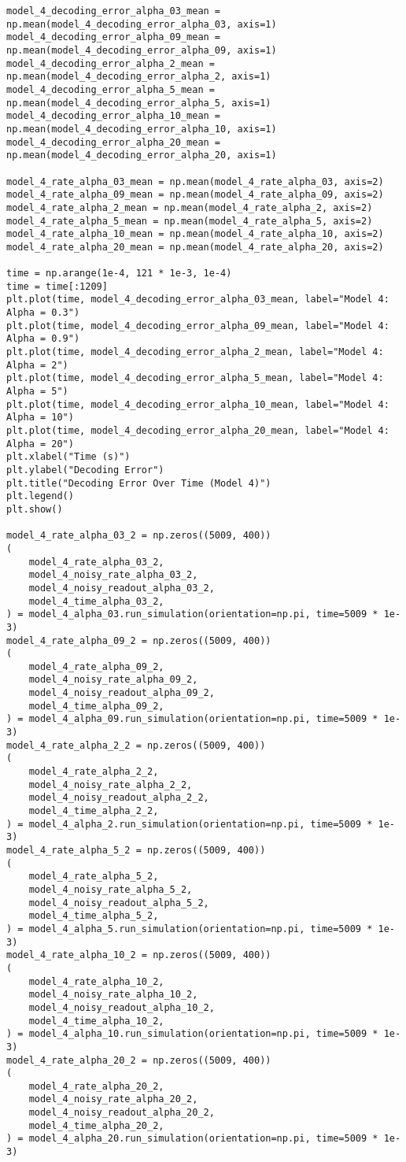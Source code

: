 \documentclass[a4paper, 11pt, oneside]{report}
\begin{document}
\begin{verbatim}
model_4_decoding_error_alpha_03_mean = np.mean(model_4_decoding_error_alpha_03, axis=1)
model_4_decoding_error_alpha_09_mean = np.mean(model_4_decoding_error_alpha_09, axis=1)
model_4_decoding_error_alpha_2_mean = np.mean(model_4_decoding_error_alpha_2, axis=1)
model_4_decoding_error_alpha_5_mean = np.mean(model_4_decoding_error_alpha_5, axis=1)
model_4_decoding_error_alpha_10_mean = np.mean(model_4_decoding_error_alpha_10, axis=1)
model_4_decoding_error_alpha_20_mean = np.mean(model_4_decoding_error_alpha_20, axis=1)

model_4_rate_alpha_03_mean = np.mean(model_4_rate_alpha_03, axis=2)
model_4_rate_alpha_09_mean = np.mean(model_4_rate_alpha_09, axis=2)
model_4_rate_alpha_2_mean = np.mean(model_4_rate_alpha_2, axis=2)
model_4_rate_alpha_5_mean = np.mean(model_4_rate_alpha_5, axis=2)
model_4_rate_alpha_10_mean = np.mean(model_4_rate_alpha_10, axis=2)
model_4_rate_alpha_20_mean = np.mean(model_4_rate_alpha_20, axis=2)

time = np.arange(1e-4, 121 * 1e-3, 1e-4)
time = time[:1209]
plt.plot(time, model_4_decoding_error_alpha_03_mean, label="Model 4: Alpha = 0.3")
plt.plot(time, model_4_decoding_error_alpha_09_mean, label="Model 4: Alpha = 0.9")
plt.plot(time, model_4_decoding_error_alpha_2_mean, label="Model 4: Alpha = 2")
plt.plot(time, model_4_decoding_error_alpha_5_mean, label="Model 4: Alpha = 5")
plt.plot(time, model_4_decoding_error_alpha_10_mean, label="Model 4: Alpha = 10")
plt.plot(time, model_4_decoding_error_alpha_20_mean, label="Model 4: Alpha = 20")
plt.xlabel("Time (s)")
plt.ylabel("Decoding Error")
plt.title("Decoding Error Over Time (Model 4)")
plt.legend()
plt.show()

model_4_rate_alpha_03_2 = np.zeros((5009, 400))
(
    model_4_rate_alpha_03_2,
    model_4_noisy_rate_alpha_03_2,
    model_4_noisy_readout_alpha_03_2,
    model_4_time_alpha_03_2,
) = model_4_alpha_03.run_simulation(orientation=np.pi, time=5009 * 1e-3)
model_4_rate_alpha_09_2 = np.zeros((5009, 400))
(
    model_4_rate_alpha_09_2,
    model_4_noisy_rate_alpha_09_2,
    model_4_noisy_readout_alpha_09_2,
    model_4_time_alpha_09_2,
) = model_4_alpha_09.run_simulation(orientation=np.pi, time=5009 * 1e-3)
model_4_rate_alpha_2_2 = np.zeros((5009, 400))
(
    model_4_rate_alpha_2_2,
    model_4_noisy_rate_alpha_2_2,
    model_4_noisy_readout_alpha_2_2,
    model_4_time_alpha_2_2,
) = model_4_alpha_2.run_simulation(orientation=np.pi, time=5009 * 1e-3)
model_4_rate_alpha_5_2 = np.zeros((5009, 400))
(
    model_4_rate_alpha_5_2,
    model_4_noisy_rate_alpha_5_2,
    model_4_noisy_readout_alpha_5_2,
    model_4_time_alpha_5_2,
) = model_4_alpha_5.run_simulation(orientation=np.pi, time=5009 * 1e-3)
model_4_rate_alpha_10_2 = np.zeros((5009, 400))
(
    model_4_rate_alpha_10_2,
    model_4_noisy_rate_alpha_10_2,
    model_4_noisy_readout_alpha_10_2,
    model_4_time_alpha_10_2,
) = model_4_alpha_10.run_simulation(orientation=np.pi, time=5009 * 1e-3)
model_4_rate_alpha_20_2 = np.zeros((5009, 400))
(
    model_4_rate_alpha_20_2,
    model_4_noisy_rate_alpha_20_2,
    model_4_noisy_readout_alpha_20_2,
    model_4_time_alpha_20_2,
) = model_4_alpha_20.run_simulation(orientation=np.pi, time=5009 * 1e-3)


\end{verbatim}
\end{document}
